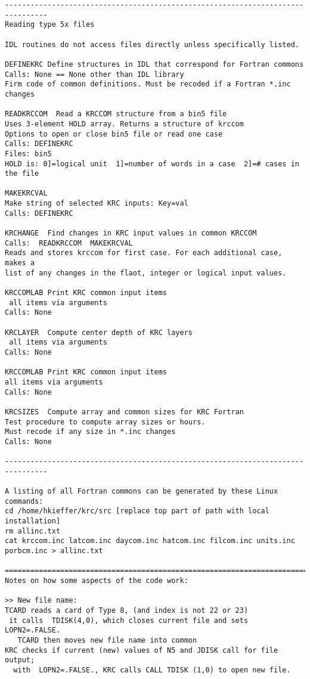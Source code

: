 \begin{verbatim}
--------------------------------------------------------------------------------
Reading type 5x files

IDL routines do not access files directly unless specifically listed.

DEFINEKRC Define structures in IDL that correspond for Fortran commons
Calls: None == None other than IDL library
Firm code of common definitions. Must be recoded if a Fortran *.inc changes

READKRCCOM  Read a KRCCOM structure from a bin5 file
Uses 3-element HOLD array. Returns a structure of krccom
Options to open or close bin5 file or read one case 
Calls: DEFINEKRC
Files: bin5
HOLD is: 0]=logical unit  1]=number of words in a case  2]=# cases in the file 

MAKEKRCVAL 
Make string of selected KRC inputs: Key=val
Calls: DEFINEKRC

KRCHANGE  Find changes in KRC input values in common KRCCOM
Calls:  READKRCCOM  MAKEKRCVAL
Reads and stores krccom for first case. For each additional case, makes a 
list of any changes in the flaot, integer or logical input values. 

KRCCOMLAB Print KRC common input items
 all items via arguments
Calls: None

KRCLAYER  Compute center depth of KRC layers
 all items via arguments
Calls: None

KRCCOMLAB Print KRC common input items
all items via arguments
Calls: None

KRCSIZES  Compute array and common sizes for KRC Fortran
Test procedure to compute array sizes or hours.
Must recode if any size in *.inc changes
Calls: None

--------------------------------------------------------------------------------

A listing of all Fortran commons can be generated by these Linux commands:
cd /home/hkieffer/krc/src [replace top part of path with local installation]
rm allinc.txt
cat krccom.inc latcom.inc daycom.inc hatcom.inc filcom.inc units.inc porbcm.inc > allinc.txt 

==============================================================================
Notes on how some aspects of the code work:

>> New file name: 
TCARD reads a card of Type 8, (and index is not 22 or 23)
 it calls  TDISK(4,0), which closes current file and sets  LOPN2=.FALSE.
   TCARD then moves new file name into common 
KRC checks if current (new) values of N5 and JDISK call for file output;
  with  LOPN2=.FALSE., KRC calls CALL TDISK (1,0) to open new file.


\end{verbatim}
